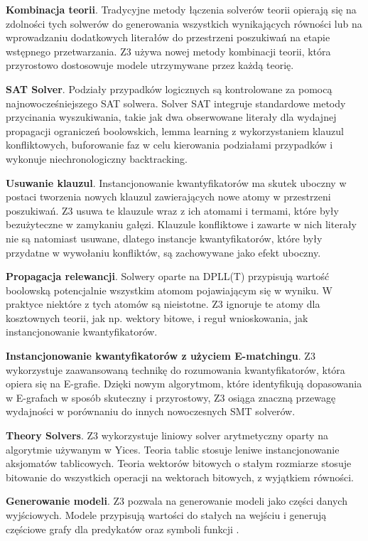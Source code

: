 \textbf{Kombinacja teorii}. Tradycyjne metody łączenia solverów teorii opierają się na zdolności tych solwerów do generowania wszystkich wynikających równości lub na wprowadzaniu dodatkowych literałów do przestrzeni poszukiwań na etapie wstępnego przetwarzania. Z3 używa nowej metody kombinacji teorii, która przyrostowo dostosowuje modele utrzymywane przez każdą teorię.

\textbf{SAT Solver}. Podziały przypadków logicznych są kontrolowane za pomocą najnowocześniejszego SAT solwera. Solver SAT integruje standardowe metody przycinania wyszukiwania, takie jak dwa obserwowane literały dla wydajnej propagacji ograniczeń boolowskich, lemma learning z wykorzystaniem klauzul konfliktowych, buforowanie faz w celu kierowania podziałami przypadków i wykonuje niechronologiczny backtracking.

\textbf{Usuwanie klauzul}. Instancjonowanie kwantyfikatorów ma skutek uboczny w postaci tworzenia nowych klauzul zawierających nowe atomy w przestrzeni poszukiwań. Z3 usuwa te klauzule wraz z ich atomami i termami, które były bezużyteczne w zamykaniu gałęzi. Klauzule konfliktowe i zawarte w nich literały nie są natomiast usuwane, dlatego instancje kwantyfikatorów, które były przydatne w wywołaniu konfliktów, są zachowywane jako efekt uboczny.

\textbf{Propagacja relewancji}. Solwery oparte na DPLL(T) przypisują wartość boolowską potencjalnie wszystkim atomom pojawiającym się w wyniku. W praktyce niektóre z tych atomów są nieistotne. Z3 ignoruje te atomy dla kosztownych teorii, jak np. wektory bitowe, i reguł wnioskowania, jak instancjonowanie kwantyfikatorów.

\textbf{Instancjonowanie kwantyfikatorów z użyciem E-matchingu}. Z3 wykorzystuje zaawansowaną technikę do rozumowania kwantyfikatorów, która opiera się na E-grafie. Dzięki nowym algorytmom, które identyfikują dopasowania w E-grafach w sposób skuteczny i przyrostowy, Z3 osiąga znaczną przewagę wydajności w porównaniu do innych nowoczesnych SMT solverów. 

\textbf{Theory Solvers}. Z3 wykorzystuje liniowy solver arytmetyczny oparty na algorytmie używanym w Yices. Teoria tablic stosuje leniwe instancjonowanie aksjomatów tablicowych. Teoria wektorów bitowych o stałym rozmiarze stosuje bitowanie do wszystkich operacji na wektorach bitowych, z wyjątkiem równości.

\textbf{Generowanie modeli}. Z3 pozwala na generowanie modeli jako części danych wyjściowych. Modele przypisują wartości do stałych na wejściu i generują częściowe grafy dla predykatów oraz symboli funkcji \cite{demoura08z}.


